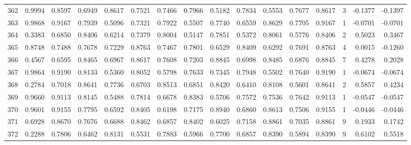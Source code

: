 \begin{tabular}{lrrrrrrrrrrrrrrr}
362 &      0.9994 &  0.8597 &  0.6949 &  0.8617 &  0.7521 &  0.7466 &  0.7966 &  0.5182 &  0.7834 &  0.5553 &   0.7677 &     0.8617 &      3 &                   -0.1377 &                    -0.1397 \\
363 &      0.9868 &  0.9167 &  0.7939 &  0.5096 &  0.7321 &  0.7922 &  0.5507 &  0.7740 &  0.6559 &  0.8629 &   0.7705 &     0.9167 &      1 &                   -0.0701 &                    -0.0701 \\
364 &      0.3383 &  0.6850 &  0.8406 &  0.6214 &  0.7379 &  0.8004 &  0.5147 &  0.7851 &  0.5372 &  0.8061 &   0.5776 &     0.8406 &      2 &                    0.5023 &                     0.3467 \\
365 &      0.8748 &  0.7488 &  0.7678 &  0.7229 &  0.8763 &  0.7467 &  0.7801 &  0.6529 &  0.8409 &  0.6292 &   0.7691 &     0.8763 &      4 &                    0.0015 &                    -0.1260 \\
366 &      0.4567 &  0.6595 &  0.8465 &  0.6967 &  0.8617 &  0.7608 &  0.7203 &  0.8845 &  0.6998 &  0.8485 &   0.6876 &     0.8845 &      7 &                    0.4278 &                     0.2028 \\
367 &      0.9864 &  0.9190 &  0.8133 &  0.5360 &  0.8052 &  0.5798 &  0.7633 &  0.7345 &  0.7948 &  0.5502 &   0.7640 &     0.9190 &      1 &                   -0.0674 &                    -0.0674 \\
368 &      0.2784 &  0.7018 &  0.8641 &  0.7736 &  0.6703 &  0.8513 &  0.6851 &  0.8420 &  0.6410 &  0.8108 &   0.5601 &     0.8641 &      2 &                    0.5857 &                     0.4234 \\
369 &      0.9660 &  0.9113 &  0.8145 &  0.5488 &  0.7814 &  0.6678 &  0.8383 &  0.5706 &  0.7572 &  0.7536 &   0.7642 &     0.9113 &      1 &                   -0.0547 &                    -0.0547 \\
370 &      0.9601 &  0.9155 &  0.7795 &  0.6592 &  0.8405 &  0.6198 &  0.7175 &  0.8940 &  0.6860 &  0.8613 &   0.7506 &     0.9155 &      1 &                   -0.0446 &                    -0.0446 \\
371 &      0.6928 &  0.8670 &  0.7676 &  0.6688 &  0.8462 &  0.6857 &  0.8402 &  0.6025 &  0.7158 &  0.8861 &   0.7035 &     0.8861 &      9 &                    0.1933 &                     0.1742 \\
372 &      0.2288 &  0.7806 &  0.6462 &  0.8131 &  0.5531 &  0.7883 &  0.5966 &  0.7700 &  0.6857 &  0.8390 &   0.5894 &     0.8390 &      9 &                    0.6102 &                     0.5518 \\

\end{tabular}
